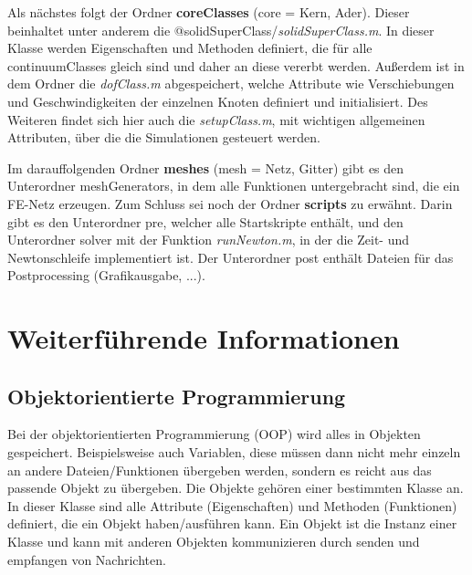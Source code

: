 \documentclass[12pt,bibstyle=none,pagenumberinfooter]{ifmdocument}
\begin{document}
Als n\"achstes folgt der Ordner \textbf{coreClasses} (core = Kern, Ader). Dieser beinhaltet unter anderem die @solidSuperClass/\textit{solidSuperClass.m}. In dieser Klasse werden Eigenschaften und Methoden definiert, die für alle continuumClasses gleich sind und daher an diese vererbt werden. Außerdem ist in dem Ordner die \textit{dofClass.m} abgespeichert, welche Attribute wie Verschiebungen und Geschwindigkeiten der einzelnen Knoten definiert und initialisiert. Des Weiteren findet sich hier auch die \textit{setupClass.m}, mit wichtigen allgemeinen Attributen, über die die Simulationen gesteuert werden. 

Im darauffolgenden Ordner \textbf{meshes} (mesh = Netz, Gitter) gibt es den Unterordner meshGenerators, in dem alle Funktionen untergebracht sind, die ein FE-Netz erzeugen.
Zum Schluss sei noch der Ordner \textbf{scripts} zu erw\"ahnt. Darin gibt es den Unterordner pre, welcher alle Startskripte enth\"alt, und den Unterordner solver mit der Funktion \textit{runNewton.m}, in der die Zeit- und Newtonschleife implementiert ist. Der Unterordner post enthält Dateien für das Postprocessing (Grafikausgabe, ...).
 
\section{Weiterführende Informationen}
	\subsection{Objektorientierte Programmierung}\label{subsec:OOP}
	Bei der objektorientierten Programmierung (OOP) wird alles in Objekten gespeichert. Beispielsweise auch Variablen, diese m\"ussen dann nicht mehr einzeln an andere Dateien/Funktionen übergeben werden, sondern es reicht aus das passende Objekt zu \"ubergeben. Die Objekte geh\"oren einer bestimmten Klasse an. In dieser Klasse sind alle Attribute (Eigenschaften) und Methoden (Funktionen) definiert, die ein Objekt haben/ausführen kann. Ein Objekt ist die Instanz einer Klasse und kann mit anderen Objekten kommunizieren durch senden und empfangen von Nachrichten.
\end{document}
